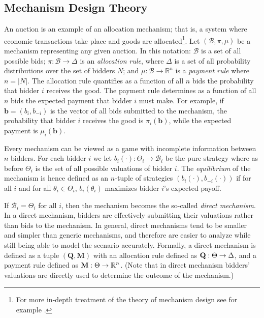 \subsection{Mechanism Design Theory} %
\label{sub:notation_mechanism_design_theory}
An auction is an example of an allocation mechanism; that is, a system where economic transactions take place and goods are allocated\footnote{For more in-depth treatment of the theory of mechanism design see for example \cite{MechDesign07,Krishna10,HarrisRaviv1981,HarrisTownsend1975,Myerson1979,Myerson1981}.}. Let $(\mathcal{B},\pi,\mu)$ be a mechanism representing any given auction. In this notation: $\mathcal{B}$ is a set of all possible bids; $\pi: \mathcal{B}\to \Delta$ is an \emph{allocation rule}, where $\Delta$ is a set of all probability distributions over the set of bidders $N$; and $\mu:\mathcal{B}\to\mathbb{R}^n$ is a \emph{payment rule} where $n = |N|$. The allocation rule quantifies as a function of all $n$ bids the probability that bidder $i$ receives the good. The payment rule determines as a function of all $n$ bids the expected payment that bidder $i$ must make. For example, if $\mathbf{b}=(b_i,b_{-i})$ is the vector of all bids submitted to the mechanism, the probability that bidder $i$ receives the good is $\pi_i(\mathbf{b})$, while the expected payment is $\mu_i(\mathbf{b})$.

Every mechanism can be viewed as a game with incomplete information between $n$ bidders. For each bidder $i$ we let $b_i(\cdot): \Theta_i \to\mathcal{B}_i$ be the pure strategy where as before $\Theta_i$ is the set of all possible valuations of bidder $i$. The \emph{equilibrium} of the mechanism is hence defined as an $n$-tuple of strategies $(b_i(\cdot),b_{-i}(\cdot))$ if for all $i$ and for all $\theta_i\in\Theta_i$, $b_i(\theta_i)$ maximizes bidder $i$'s expected payoff.

If $\mathcal{B}_i = \Theta_i$ for all $i$, then the mechanism becomes the so-called \emph{direct mechanism}. In a direct mechanism, bidders are effectively submitting their valuations rather than bids to the mechanism. In general, direct mechanisms tend to be smaller and simpler than generic mechanisms, and therefore are easier to analyze while still being able to model the scenario accurately. Formally, a direct mechanism is defined as a tuple $(\mathbf{Q},\mathbf{M})$ with an allocation rule defined as $\mathbf{Q}:\nobreak\Theta\to\Delta$, and a payment rule defined as $\mathbf{M}:\nobreak\Theta\to\mathbb{R}^n$. (Note that in direct mechanism bidders' valuations are directly used to determine the outcome of the mechanism.)

